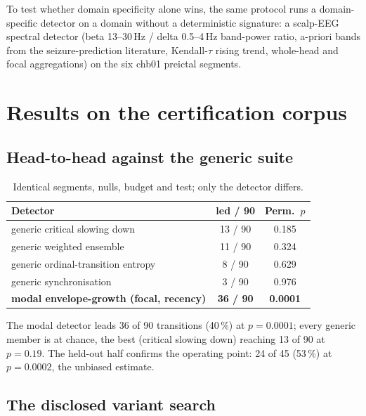 \documentclass[aip,cha,preprint,amsmath,amssymb]{revtex4-2}
\begin{document}
To test whether domain specificity alone wins, the same protocol runs a
domain-specific detector on a domain without a deterministic signature:
a scalp-EEG spectral detector (beta 13--30\,Hz / delta 0.5--4\,Hz
band-power ratio, a-priori bands from the seizure-prediction
literature, Kendall-$\tau$ rising trend, whole-head and focal
aggregations) on the six chb01 preictal segments.

\section{Results on the certification corpus}\label{sec:grid}

\subsection{Head-to-head against the generic suite}

\begin{table}[h!]
\centering
\small
\setlength{\tabcolsep}{3.5pt}
\begin{tabular}{lcc}
\toprule
Detector & led / 90 & Perm.\ $p$ \\
\midrule
generic critical slowing down & 13 / 90 & 0.185 \\
generic weighted ensemble & 11 / 90 & 0.324 \\
generic ordinal-transition entropy & 8 / 90 & 0.629 \\
generic synchronisation & 3 / 90 & 0.976 \\
\textbf{modal envelope-growth (focal, recency)} & \textbf{36 / 90} & \textbf{0.0001} \\
\bottomrule
\end{tabular}
\caption{Identical segments, nulls, budget and test; only the detector
differs.}
\label{tab:headtohead}
\end{table}

The modal detector leads 36 of 90 transitions (40\,\%) at $p = 0.0001$;
every generic member is at chance, the best (critical slowing down)
reaching 13 of 90 at $p = 0.19$. The held-out half confirms the
operating point: 24 of 45 (53\,\%) at $p = 0.0002$, the unbiased
estimate.

\subsection{The disclosed variant search}\label{sec:variants}
\end{document}
